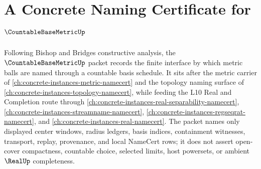 \chapter{A Concrete Naming Certificate for $\CountableBaseMetricUp$}
\label{ch:concrete-instances-countable-base-metric-namecert}

Following Bishop and Bridges constructive analysis, the $\CountableBaseMetricUp$ packet records the finite interface by which metric balls are named through a countable basis schedule. It sits after the metric carrier of \autoref{ch:concrete-instances-metric-namecert} and the topology naming surface of \autoref{ch:concrete-instances-topology-namecert}, while feeding the L10 Real and Completion route through \autoref{ch:concrete-instances-real-separability-namecert}, \autoref{ch:concrete-instances-streamname-namecert}, \autoref{ch:concrete-instances-regseqrat-namecert}, and \autoref{ch:concrete-instances-real-namecert}. The packet names only displayed center windows, radius ledgers, basis indices, containment witnesses, transport, replay, provenance, and local NameCert rows; it does not assert open-cover compactness, countable choice, selected limits, host powersets, or ambient $\RealUp$ completeness.

